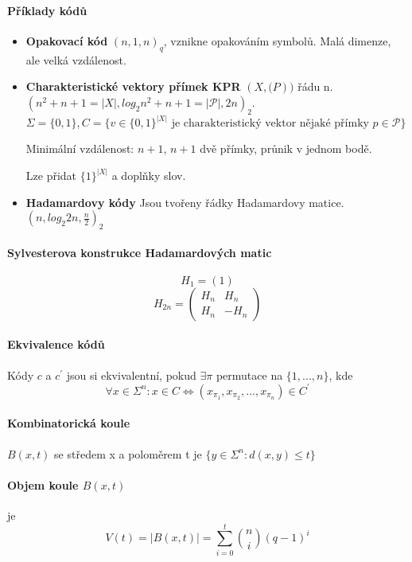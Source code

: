 \documentclass[10pt,a4paper]{article}
\theoremstyle{plain}
\begin{document}
\paragraph{Příklady kódů} \begin{itemize}
\item \textbf{Opakovací kód} $(n,1,n)_q$, vznikne opakováním symbolů. Malá dimenze, ale velká vzdálenost.
\item \textbf{Charakteristické vektory přímek KPR} $(X, \mathcal(P))$ řádu n. $(n^2+n+1=|X|,log_2 n^2+n+1 = |\mathcal{P}|, 2n)_2$. $\Sigma=\{0,1\}, C=\{ v \in \{0,1\}^{|X|} \text{ je charakteristický vektor nějaké přímky } p \in \mathcal{P} \}$

Minimální vzdálenost: $n+1$, $n+1$ dvě přímky, průnik v jednom bodě.

Lze přidat $\{1\}^{|X|}$ a doplňky slov.
\item \textbf{Hadamardovy kódy} Jsou tvořeny řádky Hadamardovy matice.  $(n,log_2 2n, \frac{n}2)_2$

\end{itemize}

\paragraph{Sylvesterova konstrukce Hadamardových matic} \[H_1 = (1)\]
\[ H_{2n} = \begin{pmatrix}
H_n & H_n \\
H_n & -H_n
\end{pmatrix} \]

\paragraph{Ekvivalence kódů} Kódy $c$ a $c^\prime$ jsou si ekvivalentní, pokud $\exists \pi$ permutace na $\{1,...,n\}$, kde 
\[ \forall x \in \Sigma^n: x \in C \iff (x_{\pi_1}, x_{\pi_2}, ..., x_{\pi_n}) \in C^\prime \]

\paragraph{Kombinatorická koule} $B(x,t)$ se středem x a poloměrem t je $\{y \in \Sigma^n: d(x,y) \leq t\}$

\paragraph{Objem koule $B(x,t)$} je \[ V(t) = |B(x,t)| = \sum^t_{i=0} \binom{n}i (q-1)^i\]
\end{document}

